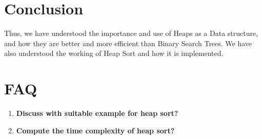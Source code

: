 \documentclass[11pt]{article}
\begin{document}


\section{Conclusion}
Thus, we have understood the importance and use of Heaps as a Data structure, and how they are better and more efficient than Binary Search Trees. We have also understood the working of Heap Sort and how it is implemented.

\clearpage

\section{FAQ}
\begin{enumerate}
    \item \textbf{Discuss with suitable example for heap sort?}\\

    \item \textbf{Compute the time complexity of heap sort?}\\

\end{enumerate}
\end{document}
